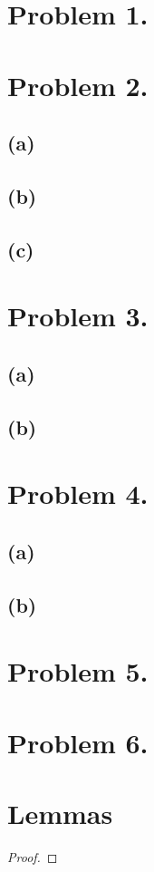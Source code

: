 \documentclass[12pt]{extarticle}
\begin{document}
 
\section*{Problem 1.}
     
\section*{Problem 2.}

\subsection*{(a)}

\subsection*{(b)}

\subsection*{(c)}

\section*{Problem 3.}

\subsection*{(a)}

\subsection*{(b)}

\section*{Problem 4.}

\subsection*{(a)}

\subsection*{(b)}

\section*{Problem 5.}

\section*{Problem 6.}
              
\section*{Lemmas}

\begin{lemma} \label{prodcompac}

\end{lemma}

\begin{proof}
 
\end{proof}
\end{document}
